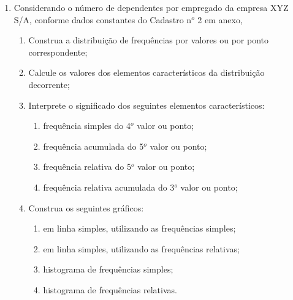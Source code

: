 \begin{enumerate}
\item Considerando o número de dependentes por empregado da
empresa XYZ S/A, conforme dados constantes do Cadastro n$^o$ 2 em anexo,
	\begin{enumerate}
	\item Construa a distribuição de frequências por valores ou por ponto correspondente;
	\item Calcule os valores dos elementos característicos da distribuição decorrente;
	\item Interprete o significado dos seguintes elementos característicos:
		\begin{enumerate}
		\item frequência simples do 4$^o$ valor ou ponto;
		\item frequência acumulada do 5$^o$ valor ou ponto;
		\item frequência relativa do 5$^o$ valor ou ponto;
		\item frequência relativa acumulada do 3$^o$ valor ou ponto;
		\end{enumerate}
	\item Construa os seguintes gráficos:
		\begin{enumerate}
		\item em linha simples, utilizando as frequências simples;
		\item em linha simples, utilizando as frequências relativas;
		\item histograma de frequências simples;
		\item histograma de frequências relativas.
		\end{enumerate}
	\end{enumerate}
	

\end{enumerate}
